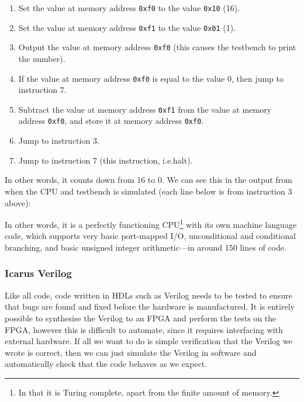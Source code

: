 \documentclass[12pt]{article}
\begin{document}
\begin{enumerate}
	\item Set the value at memory address \texttt{0xf0} to the value \texttt{0x10} (16).
	\item Set the value at memory address \texttt{0xf1} to the value \texttt{0x01} (1).
	\item Output the value at memory address \texttt{0xf0} (this causes the testbench to print the number).
	\item If the value at memory address \texttt{0xf0} is equal to the value 0, then jump to instruction 7.
	\item Subtract the value at memory address \texttt{0xf1} from the value at memory address \texttt{0xf0}, and store it at memory address \texttt{0xf0}.
	\item Jump to instruction 3.
	\item Jump to instruction 7 (this instruction, i.e.\@ halt).
\end{enumerate}

In other words, it counts down from 16 to 0. We can see this in the output from when the CPU and testbench is simulated (each line below is from instruction 3 above):



In other words, it is a perfectly functioning CPU\footnote{In that it is Turing complete, apart from the finite amount of memory.} with its own machine language code, which supports very basic port-mapped I/O, unconditional and conditional branching, and basic unsigned integer arithmetic---in around 150 lines of code.

\subsubsection{Icarus Verilog}

Like all code, code written in HDLs such as Verilog needs to be tested to ensure that bugs are found and fixed before the hardware is manufactured. It is entirely possible to synthesise the Verilog to an FPGA and perform the tests on the FPGA, however this is difficult to automate, since it requires interfacing with external hardware. If all we want to do is simple verification that the Verilog we wrote is correct, then we can just simulate the Verilog in software and automatically check that the code behaves as we expect.
\end{document}
